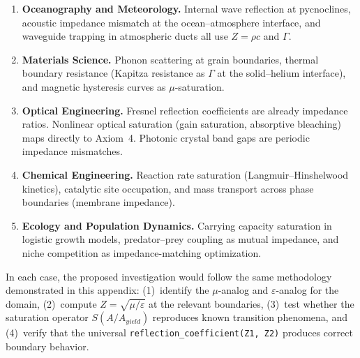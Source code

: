 \begin{enumerate}
\item \textbf{Oceanography and Meteorology.}
Internal wave reflection at pycnoclines, acoustic impedance mismatch
at the ocean--atmosphere interface, and waveguide trapping in
atmospheric ducts all use $Z = \rho c$ and $\Gamma$.

\item \textbf{Materials Science.}
Phonon scattering at grain boundaries, thermal boundary resistance
(Kapitza resistance as $\Gamma$ at the solid--helium interface),
and magnetic hysteresis curves as $\mu$-saturation.

\item \textbf{Optical Engineering.}
Fresnel reflection coefficients are already impedance ratios.
Nonlinear optical saturation (gain saturation, absorptive bleaching)
maps directly to Axiom~4.  Photonic crystal band gaps are periodic
impedance mismatches.

\item \textbf{Chemical Engineering.}
Reaction rate saturation (Langmuir--Hinshelwood kinetics), catalytic
site occupation, and mass transport across phase boundaries
(membrane impedance).

\item \textbf{Ecology and Population Dynamics.}
Carrying capacity saturation in logistic growth models, predator--prey
coupling as mutual impedance, and niche competition as
impedance-matching optimization.

\end{enumerate}

\medskip
\noindent
In each case, the proposed investigation would follow the same
methodology demonstrated in this appendix: (1)~identify the
$\mu$-analog and $\varepsilon$-analog for the domain, (2)~compute
$Z = \sqrt{\mu/\varepsilon}$ at the relevant boundaries, (3)~test
whether the saturation operator $S(A/A_{yield})$ reproduces known
transition phenomena, and (4)~verify that the universal
\texttt{reflection\_coefficient(Z1, Z2)} produces correct boundary
behavior.

